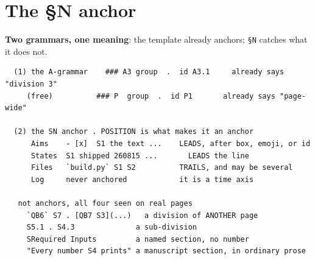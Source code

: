 
\section{The §N anchor}
\textbf{Two grammars, one meaning}: the template already anchors; \texttt{§N} catches what it does not.

\begin{verbatim}
  (1) the A-grammar    ### A3 group  .  id A3.1     already says "division 3"
     (free)          ### P  group  .  id P1       already says "page-wide"

  (2) the SN anchor . POSITION is what makes it an anchor
      Aims    - [x]  S1 the text ...    LEADS, after box, emoji, or id
      States  S1 shipped 260815 ...       LEADS the line
      Files   `build.py` S1 S2          TRAILS, and may be several
      Log     never anchored            it is a time axis

   not anchors, all four seen on real pages
     `QB6` S7 . [QB7 S3](...)   a division of ANOTHER page
     S5.1 . S4.3              a sub-division
     SRequired Inputs         a named section, no number
     "Every number S4 prints" a manuscript section, in ordinary prose
\end{verbatim}
